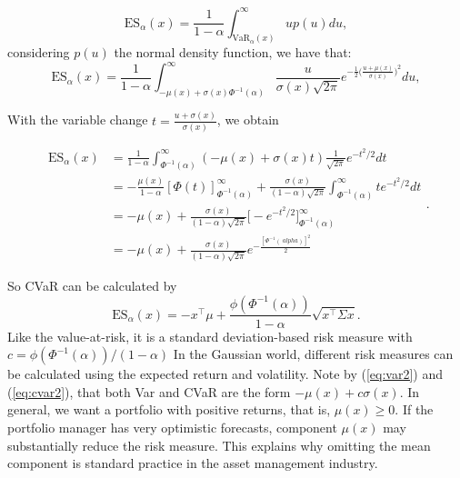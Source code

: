 \[
	\mbox{ES}_\alpha(x) = \frac{1}{1-\alpha}\int_{\mbox{VaR}_\alpha(x)}^\infty u p(u)du,
\] considering $p(u)$ the normal density function, we have that:
\[
	\mbox{ES}_\alpha(x) = \frac{1}{1-\alpha}\int_{-\mu(x)+ \sigma(x)\Phi^{-1}(\alpha)} ^\infty \frac{u}{\sigma(x)\sqrt{2\pi}} e^{-\frac{1}{2}\Big(\frac{u+\mu(x)}{\sigma (x)}\Big)^2} du,
\]

With the variable change
$t=\frac{u+\sigma(x)}{\sigma(x)}$, we obtain

\[
	\begin{aligned}
		\mbox{ES}_\alpha(x) & = \frac{1}{1-\alpha}\int_{\Phi^{-1}(\alpha)}^\infty (-\mu(x)+ \sigma(x)t) \frac{1}{\sqrt{2\pi}} e^{-t^2/2}dt \\
		                    & = -\frac{\mu(x)}{1-\alpha}[\Phi(t)]_{\Phi^{-1}(\alpha)}^\infty +
		\frac{\sigma(x)}{(1-\alpha)\sqrt{2\pi}}\int_{\Phi^{-1}(\alpha)}^\infty t e^{-t^2/ 2}dt                                             \\
		                    & =-\mu(x) + \frac{\sigma(x)}{(1-\alpha)\sqrt{2\pi}}\Big[-e^{-t^2/2} \Big] _{\Phi^{-1}(\alpha)}^\infty         \\
		                    & = -\mu(x) + \frac{\sigma(x)}{(1-\alpha)\sqrt{2\pi}}e^{-\frac{[\Phi^{-1}(\ alpha)]^2}{2}}
	\end{aligned}.
\]

So CVaR can be calculated by
\begin{equation}\label{eq:cvar2}
	\mbox{ES}_\alpha(x)=-x^\top \mu + \frac{\phi(\Phi^{-1}(\alpha))}{1-\alpha}\sqrt{x^ \top \Sigma x}.
\end{equation}
Like the value-at-risk, it is a standard deviation-based risk measure with $c ={\phi(\Phi^{-1}(\alpha))}/{(1-\alpha)}$
In the Gaussian world, different risk measures can be calculated using the expected return and volatility. Note by (\ref{eq:var2}) and (\ref{eq:cvar2}), that both Var and CVaR are the form $-\mu(x)+c\sigma(x)$. In general, we want a portfolio with positive returns, that is, $\mu(x)\geq0$. If the portfolio manager has very optimistic forecasts, component $\mu(x)$ may substantially reduce the risk measure. This explains why omitting the mean component is standard practice in the asset management industry.

